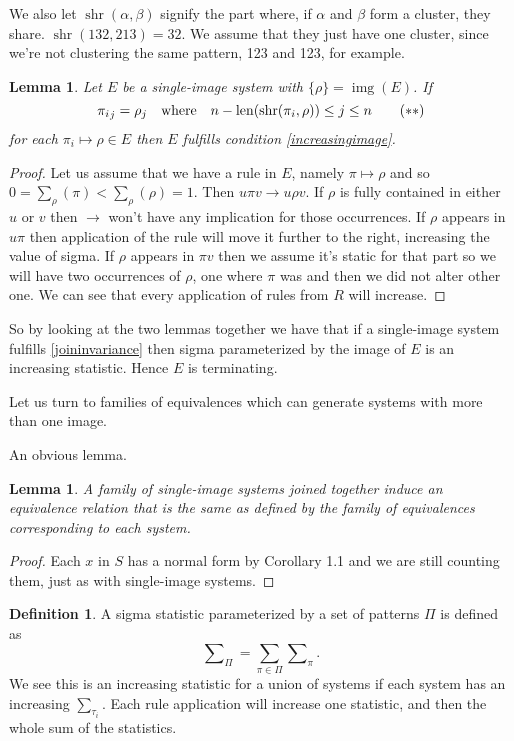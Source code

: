 \documentclass[a4paper, 11pt, english]{article}
\newcommand{\patternrule}{ \mapsto \!}
\newtheorem{lemma}[theorem]{Lemma}
\theoremstyle{definition}
\newtheorem{definition}[theorem]{Definition}
\newcommand{\Sym}{S}
\DeclareMathOperator{\img}{img}
\DeclareMathOperator{\len}{len}
\DeclareMathOperator{\shr}{shr}
\begin{document}
 We also let $\shr(\alpha,
\beta)$ signify the part where, if $\alpha$ and $\beta$ form a cluster, they
share. $\shr(132, 213) = 32$. We assume that they just have one cluster, since
we're not clustering the same pattern, 123 and 123, for example. 

\begin{lemma}
    Let $E$ be a single-image system with $\{\rho\} = \img(E)$. If
    \[
        {\pi_i}_j = \rho_j \quad \textnormal{where} \quad n-\len(\shr(\pi_i,
        \rho)) \leq j \leq n \tag{$\ast\ast$} \label{joininvariance}
    \]
    for each $\pi_i \patternrule \rho \in E$ then $E$ fulfills condition
    \eqref{increasingimage}. \end{lemma}
\begin{proof}
    Let us assume that we have a rule in $E$, namely $\pi \patternrule \rho$ and so
    $0 = \sum_\rho(\pi) < \sum_\rho(\rho) = 1$. Then $u \pi v \to u \rho v$. 
    If $\rho$ is fully contained in either $u$ or $v$ then $\to$ won't have any
    implication for those occurrences. If $\rho$ appears in $u\pi$ then
    application of the rule will move it further to the right, increasing the
    value of sigma. If $\rho$ appears in $\pi v$ then we assume it's static for
    that part so we will have two occurrences of $\rho$, one where $\pi$ was and
    then we did not alter other one.
    We can see that every application of rules from $R$ will increase.
\end{proof}

So by looking at the two lemmas together we have that if a single-image system
fulfills \eqref{joininvariance} then sigma parameterized by the image of $E$ is
an increasing statistic. Hence $E$ is terminating.

Let us turn to families of equivalences which can generate systems with more
than one image.

An obvious lemma.
\begin{lemma}
    A family of single-image systems joined together induce an equivalence
    relation that is the same as defined by the family of equivalences
    corresponding to each system.
\end{lemma}
\begin{proof}
    Each $x$ in $\Sym$ has a normal form by Corollary 1.1 and we are still counting
    them, just as with single-image systems.
\end{proof}

\begin{definition}
    A sigma statistic parameterized by a set of patterns $\Pi$ is defined as
    $$
        \sum\nolimits_\Pi = \sum_{\pi \in \Pi} \sum\nolimits_{\pi}.
    $$
    We see this is an increasing statistic for a union of systems if
    each system has an increasing $\sum_{\tau_i}$.  Each rule application will
    increase one statistic, and then the whole sum of the statistics.
\end{definition}
\end{document}
